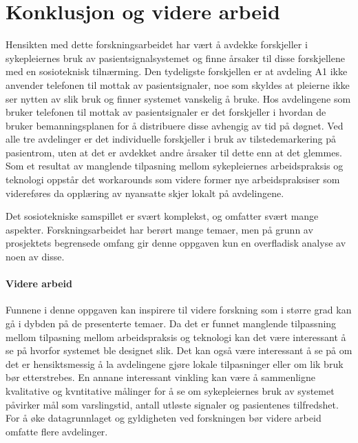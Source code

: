 \chapter{Konklusjon og videre arbeid}
\label{chp:konklusjon} 
Hensikten med dette forskningsarbeidet har vært å avdekke forskjeller i sykepleiernes bruk av pasientsignalsystemet og finne årsaker til disse forskjellene med en sosioteknisk tilnærming. Den tydeligste forskjellen er at avdeling A1 ikke anvender telefonen til mottak av pasientsignaler, noe som skyldes at pleierne ikke ser nytten av slik bruk og finner systemet vanskelig å bruke. Hos avdelingene som bruker telefonen til mottak av pasientsignaler er det forskjeller i hvordan de bruker bemanningsplanen for å distribuere disse avhengig av tid på døgnet. Ved alle tre avdelinger er det individuelle forskjeller i bruk av tilstedemarkering på pasientrom, uten at det er avdekket andre årsaker til dette enn at det glemmes. Som et resultat av manglende tilpasning mellom sykepleiernes arbeidspraksis og teknologi oppstår det workarounds som videre former nye arbeidspraksiser som videreføres da opplæring av nyansatte skjer lokalt på avdelingene. 

\noindent
Det sosiotekniske samspillet er svært komplekst, og omfatter svært mange aspekter. Forskningsarbeidet har berørt mange temaer, men på grunn av prosjektets begrensede omfang gir denne oppgaven kun en overfladisk analyse av noen av disse. 

\subsubsection{Videre arbeid}
Funnene i denne oppgaven kan inspirere til videre forskning som i større grad kan gå i dybden på de presenterte temaer. Da det er funnet manglende tilpassning mellom tilpasning mellom arbeidspraksis og teknologi kan det være interessant å se på hvorfor systemet ble designet slik. Det kan også være interessant å se på om det er hensiktsmessig å la avdelingene gjøre lokale tilpasninger eller om lik bruk bør etterstrebes. En annane interessant vinkling kan være å sammenligne kvalitative og kvntitative målinger for å se om sykepleiernes bruk av systemet påvirker mål som varslingstid, antall utløste signaler og pasientenes tilfredshet. For å øke datagrunnlaget og gyldigheten ved forskningen bør videre arbeid omfatte flere avdelinger. 